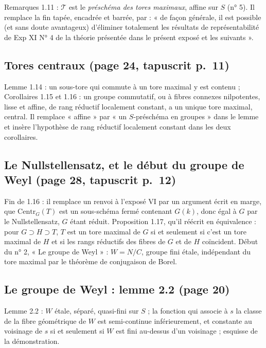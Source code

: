 \documentclass[11pt,a4paper]{article}
\begin{document}
Remarques 1.11 : $\mathcal{T}$ est le \emph{préschéma des
tores maximaux}, affine sur $S$ (n° 5). Il remplace la fin tapée, encadrée
et barrée, par : « de façon générale, il est possible (et sans doute
avantageux) d'éliminer totalement les résultats de représentabilité de
Exp XI N° 4 de la théorie présentée dans le présent exposé et les
suivants ».

\subsection*{Tores centraux (page 24, tapuscrit p.~11)}

Lemme 1.14 : un sous-tore qui commute à un tore maximal y
est contenu ; Corollaires 1.15 et 1.16 : un groupe commutatif, ou à fibres
connexes nilpotentes, lisse et affine, de rang réductif localement
constant, a un unique tore maximal, central. Il remplace « affine »
par « un $S$-préschéma en groupes » dans le lemme et insère
l'hypothèse de rang réductif localement constant dans les deux corollaires.

\subsection*{Le Nullstellensatz, et le début du groupe de Weyl (page 28, tapuscrit p.~12)}

Fin de 1.16 : il remplace un renvoi à l'exposé VI par un
argument écrit en marge, que $\mathrm{Centr}_{G}(T)$ est un sous-schéma
fermé contenant $G(k)$, donc égal à $G$ par le Nullstellensatz, $G$ étant
réduit. Proposition 1.17, qu'il réécrit en équivalence : pour
$G \supset H \supset T$, $T$ est un tore maximal de $G$ si et seulement si
c'est un tore maximal de $H$ et si les rangs réductifs des fibres de $G$
et de $H$ coïncident. Début du n° 2, « Le groupe de Weyl » :
$W = N/C$, groupe fini étale, indépendant du tore maximal par le théorème
de conjugaison de Borel.

\subsection*{Le groupe de Weyl : lemme 2.2 (page 20)}

Lemme 2.2 : $W$ étale, séparé, quasi-fini sur $S$ ; la
fonction qui associe à $s$ la classe de la fibre géométrique de $W$ est
semi-continue inférieurement, et constante au voisinage de $s$ si et
seulement si $W$ est fini au-dessus d'un voisinage ; esquisse de la
démonstration.
\end{document}
